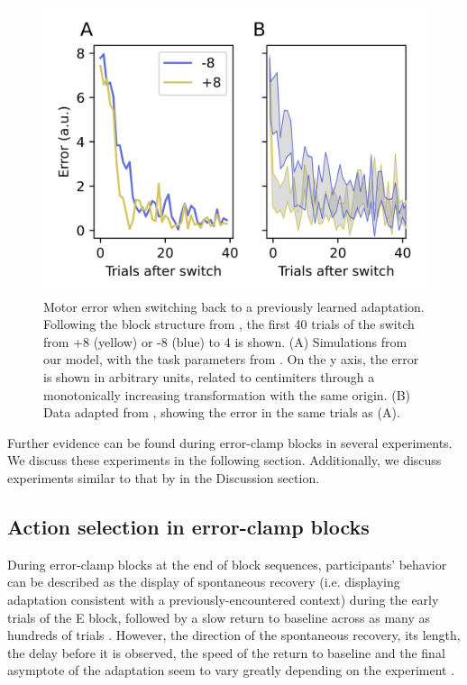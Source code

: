 \documentclass[a4paper,doc,floatsintext,natbib]{apa6}
\begin{document}
\begin{figure}
\centering
\includegraphics{./figures/figure_4.png}
\caption{Motor error when switching back to a previously learned adaptation. Following the block structure from \cite{Davidson_Scaling_2004}, the first 40 trials of the switch from +8 (yellow) or -8 (blue) to 4 is shown. (A) Simulations from our model, with the task parameters from \cite{Davidson_Scaling_2004}. On the y axis, the error is shown in arbitrary units, related to centimiters through a monotonically increasing transformation with the same origin. (B) Data adapted from \cite{Davidson_Scaling_2004}, showing the error in the same trials as (A).}
\label{fig:davidson-2004}
\end{figure}

Further evidence can be found during error-clamp blocks in several experiments. We discuss these experiments in the following section. Additionally, we discuss experiments similar to that by \cite{Davidson_Scaling_2004} in the Discussion section.


\subsection{Action selection in error-clamp blocks}
During error-clamp blocks at the end of block sequences, participants' behavior can be described as the display of spontaneous recovery (i.e. displaying adaptation consistent with a previously-encountered context) during the early trials of the E block, followed by a slow return to baseline across as many as hundreds of trials \citep{Brennan_Decay_2015}. However, the direction of the spontaneous recovery, its length, the delay before it is observed, the speed of the return to baseline and the final asymptote of the adaptation seem to vary greatly depending on the experiment \citep{Brennan_Decay_2015,Vaswani_Decay_2013,Smith_Interacting_2006,Shmuelof_Overcoming_2012}.
\end{document}

